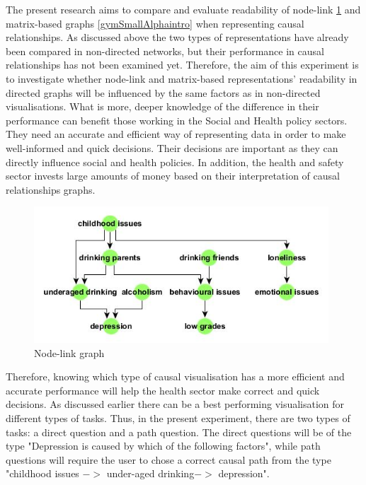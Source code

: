 \documentclass{l4proj}
\begin{document}
The present research aims to compare and evaluate readability of node-link \ref{drinkingIssuesSmallHierIntro} and matrix-based graphs \ref{gymSmallAlphaintro} when representing causal relationships. As discussed above the two types of representations have already been compared in non-directed networks, but their performance in causal relationships has not been examined yet. Therefore, the aim of this experiment is to investigate whether node-link and matrix-based representations' readability in directed graphs will be influenced by the same factors as in non-directed visualisations. What is more, deeper knowledge of the difference in their performance can benefit those working in the Social and Health policy sectors. They need an accurate and efficient way of representing data in order to make well-informed and quick decisions. Their decisions are important as they can directly influence social and health policies. In addition, the health and safety sector invests large amounts of money based on their interpretation of causal relationships graphs.


\begin{figure}[H]
\centering
\includegraphics[width=11cm]{images/drinkingIssuesSmallHier.jpg}
\caption{Node-link graph}
\label{drinkingIssuesSmallHierIntro}
\end{figure}

Therefore, knowing which type of causal visualisation has a more efficient and accurate performance will help the health sector make correct and quick decisions. As discussed earlier there can be a best performing visualisation for different types of tasks. Thus, in the present experiment, there are two types of tasks: a direct question and a path question. The direct questions will be of the type "Depression is caused by which of the following factors", while path questions will require the user to chose a correct causal path from the type "childhood issues $->$ under-aged drinking$->$ depression". 
\end{document}
